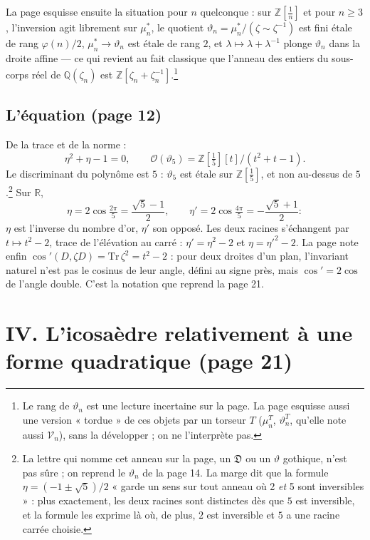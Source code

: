 \documentclass[11pt,a4paper]{article}
\begin{document}
La page esquisse ensuite la situation pour $n$ quelconque : sur
$\mathbb{Z}[\frac1n]$ et pour $n \geqslant 3$, l'inversion agit librement sur
$\mu_n^{*}$, le quotient $\vartheta_n = \mu_n^{*}/(\zeta \sim \zeta^{-1})$
est fini étale de rang $\varphi(n)/2$, $\mu_n^{*} \to \vartheta_n$ est étale
de rang $2$, et $\lambda \mapsto \lambda + \lambda^{-1}$ plonge $\vartheta_n$
dans la droite affine --- ce qui revient au fait classique que l'anneau des
entiers du sous-corps réel de $\mathbb{Q}(\zeta_n)$ est
$\mathbb{Z}[\zeta_n + \zeta_n^{-1}]$.\footnote{Le rang de $\vartheta_n$ est
une lecture incertaine sur la page. La page esquisse aussi une version
« tordue » de ces objets par un torseur $T$ ($\mu_n^{T}$, $\vartheta_n^{T}$,
qu'elle note aussi $\mathcal{V}_n$), sans la développer ; on ne
l'interprète pas.}

\subsection*{L'équation (page 12)}

De la trace et de la norme :
\[
\eta^{2} + \eta - 1 = 0,\qquad \mathcal{O}(\vartheta_5) = \mathbb{Z}[\tfrac15][t]/(t^{2} + t - 1).
\]
Le discriminant du polynôme est $5$ : $\vartheta_5$ est étale sur
$\mathbb{Z}[\frac15]$, et non au-dessus de $5$.\footnote{La lettre qui nomme
cet anneau sur la page, un $\mathfrak{D}$ ou un $\vartheta$ gothique, n'est
pas sûre ; on reprend le $\vartheta_n$ de la page 14. La marge dit que la
formule $\eta = (-1 \pm \sqrt5)/2$ « garde un sens sur tout anneau où 2
\emph{et} 5 sont inversibles » : plus exactement, les deux racines sont
distinctes dès que $5$ est inversible, et la formule les exprime là où, de
plus, $2$ est inversible et $5$ a une racine carrée choisie.} Sur
$\mathbb{R}$,
\[
\eta = 2\cos\tfrac{2\pi}{5} = \frac{\sqrt5 - 1}{2},\qquad \eta' = 2\cos\tfrac{4\pi}{5} = -\frac{\sqrt5 + 1}{2} :
\]
$\eta$ est l'inverse du nombre d'or, $\eta'$ son opposé. Les deux racines
s'échangent par $t \mapsto t^{2} - 2$, trace de l'élévation au carré :
$\eta' = \eta^{2} - 2$ et $\eta = \eta'^{2} - 2$. La page note enfin
$\cos'(D, \zeta D) = \mathrm{Tr}\,\zeta^{2} = t^{2} - 2$ : pour deux droites
d'un plan, l'invariant naturel n'est pas le cosinus de leur angle, défini au
signe près, mais $\cos' = 2\cos$ de l'angle double. C'est la notation que
reprend la page 21.

\section*{IV. L'icosaèdre relativement à une forme quadratique (page 21)}
\end{document}
